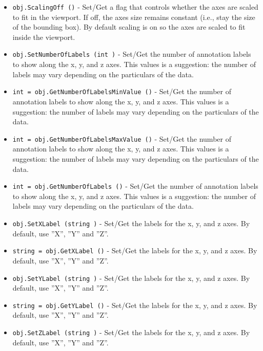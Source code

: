 \begin{itemize}
\item  \verb|obj.ScalingOff ()| -  Set/Get a flag that controls whether the axes are scaled to fit in
 the viewport. If off, the axes size remains constant (i.e., stay the
 size of the bounding box). By default scaling is on so the axes are
 scaled to fit inside the viewport.

\item  \verb|obj.SetNumberOfLabels (int )| -  Set/Get the number of annotation labels to show along the x, y, and 
 z axes. This values is a suggestion: the number of labels may vary
 depending on the particulars of the data.

\item  \verb|int = obj.GetNumberOfLabelsMinValue ()| -  Set/Get the number of annotation labels to show along the x, y, and 
 z axes. This values is a suggestion: the number of labels may vary
 depending on the particulars of the data.

\item  \verb|int = obj.GetNumberOfLabelsMaxValue ()| -  Set/Get the number of annotation labels to show along the x, y, and 
 z axes. This values is a suggestion: the number of labels may vary
 depending on the particulars of the data.

\item  \verb|int = obj.GetNumberOfLabels ()| -  Set/Get the number of annotation labels to show along the x, y, and 
 z axes. This values is a suggestion: the number of labels may vary
 depending on the particulars of the data.

\item  \verb|obj.SetXLabel (string )| -  Set/Get the labels for the x, y, and z axes. By default, 
 use ''X'', ''Y'' and ''Z''.

\item  \verb|string = obj.GetXLabel ()| -  Set/Get the labels for the x, y, and z axes. By default, 
 use ''X'', ''Y'' and ''Z''.

\item  \verb|obj.SetYLabel (string )| -  Set/Get the labels for the x, y, and z axes. By default, 
 use ''X'', ''Y'' and ''Z''.

\item  \verb|string = obj.GetYLabel ()| -  Set/Get the labels for the x, y, and z axes. By default, 
 use ''X'', ''Y'' and ''Z''.

\item  \verb|obj.SetZLabel (string )| -  Set/Get the labels for the x, y, and z axes. By default, 
 use ''X'', ''Y'' and ''Z''.


\end{itemize}
